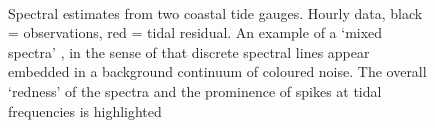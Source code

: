 \begin{frame}
\begin{figure}[h]\centering
	 \\
	\caption{Spectral estimates from two coastal tide gauges. Hourly data, black = observations, red = tidal residual. An example of a `mixed spectra' \citep{Percival:1998tw}, in the sense of that discrete spectral lines appear embedded in a background continuum of coloured noise.  The overall `redness' of the spectra and the prominence of spikes at tidal frequencies is highlighted }
    \label{fig:SPECTRA_EG}
\end{figure}

\end{frame}